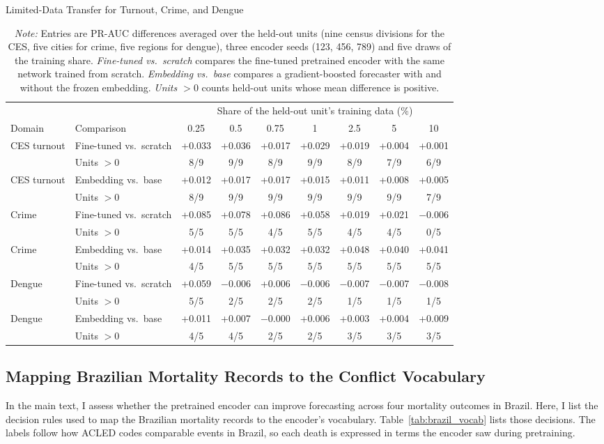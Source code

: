\documentclass[11pt, letterpaper]{article}
\begin{document}
\begin{table}[!htbp]
\centering
\caption{Limited-Data Transfer for Turnout, Crime, and Dengue}
\label{tab:domains}
\small
\begin{tabular}{llccccccc}
\hline
 & & \multicolumn{7}{c}{Share of the held-out unit's training data (\%)} \\
Domain & Comparison & 0.25 & 0.5 & 0.75 & 1 & 2.5 & 5 & 10 \\
\hline
CES turnout & Fine-tuned vs.\ scratch & +0.033 & +0.036 & +0.017 & +0.029 & +0.019 & +0.004 & +0.001 \\
 & Units $>0$ & 8/9 & 9/9 & 8/9 & 9/9 & 8/9 & 7/9 & 6/9 \\
CES turnout & Embedding vs.\ base & +0.012 & +0.017 & +0.017 & +0.015 & +0.011 & +0.008 & +0.005 \\
 & Units $>0$ & 8/9 & 9/9 & 9/9 & 9/9 & 9/9 & 9/9 & 7/9 \\
Crime & Fine-tuned vs.\ scratch & +0.085 & +0.078 & +0.086 & +0.058 & +0.019 & +0.021 & $-$0.006 \\
 & Units $>0$ & 5/5 & 5/5 & 4/5 & 5/5 & 4/5 & 4/5 & 0/5 \\
Crime & Embedding vs.\ base & +0.014 & +0.035 & +0.032 & +0.032 & +0.048 & +0.040 & +0.041 \\
 & Units $>0$ & 4/5 & 5/5 & 5/5 & 5/5 & 5/5 & 5/5 & 5/5 \\
Dengue & Fine-tuned vs.\ scratch & +0.059 & $-$0.006 & +0.006 & $-$0.006 & $-$0.007 & $-$0.007 & $-$0.008 \\
 & Units $>0$ & 5/5 & 2/5 & 2/5 & 2/5 & 1/5 & 1/5 & 1/5 \\
Dengue & Embedding vs.\ base & +0.011 & +0.007 & $-$0.000 & +0.006 & +0.003 & +0.004 & +0.009 \\
 & Units $>0$ & 4/5 & 4/5 & 2/5 & 2/5 & 3/5 & 3/5 & 3/5 \\
\hline
\end{tabular}
\caption*{\footnotesize \textit{Note:} Entries are PR-AUC differences averaged over the held-out units (nine census divisions for the CES, five cities for crime, five regions for dengue), three encoder seeds (123, 456, 789) and five draws of the training share. \emph{Fine-tuned vs.\ scratch} compares the fine-tuned pretrained encoder with the same network trained from scratch. \emph{Embedding vs.\ base} compares a gradient-boosted forecaster with and without the frozen embedding. \emph{Units $>0$} counts held-out units whose mean difference is positive.}
\end{table}
\subsection{Mapping Brazilian Mortality Records to the Conflict Vocabulary}
\label{app:vocab}
In the main text, I assess whether the pretrained encoder can improve forecasting across four mortality outcomes in Brazil. Here, I list the decision rules used to map the Brazilian mortality records to the encoder's vocabulary. Table~\ref{tab:brazil_vocab} lists those decisions. The labels follow how ACLED codes comparable events in Brazil, so each death is expressed in terms the encoder saw during pretraining.
\end{document}
